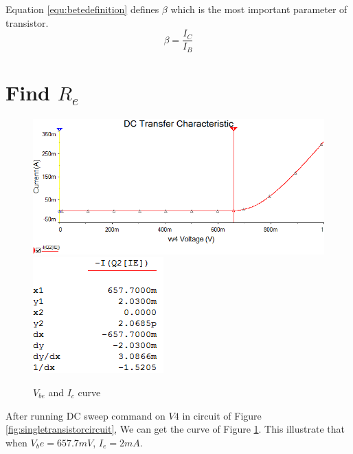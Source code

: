  Equation \ref{equ:betedefinition} defines $\beta$ which is the most important parameter of transistor.  
\begin{equation}
\beta = \frac{I_C}{I_B}
\label{equ:betedefinition}
\end{equation}

\section{Find $ R_e $ }

\begin{figure}[htbp]
  \centering
  \includegraphics[scale=0.6]{"../Photo/Chap1/Ie is 2 mA Vbe is 657mV"}\\[0.5cm]
  \includegraphics[scale=0.8]{"../Photo/Chap1/Ie is 2 mA Vbe is 657mV data"}
  \caption{$ V_{be} $ and $ I_c $ curve}
  \label{fig:VbeandIccurve}
\end{figure}

After running DC sweep command on $ V4 $ in circuit of Figure \ref{fig:singletransistorcircuit}, We can get the curve of Figure \ref{fig:VbeandIccurve}. This illustrate that when $ V_be = 657.7 mV $, $ I_e = 2 mA $.

